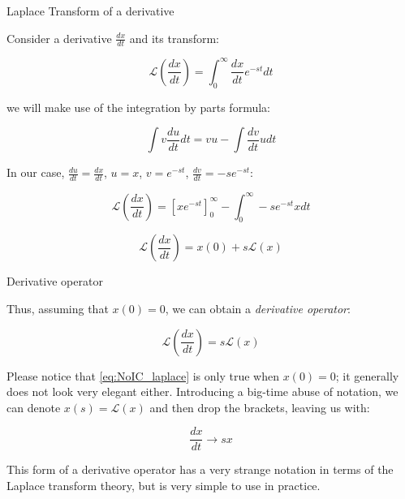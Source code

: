 \documentclass{beamer}
\begin{document}
\begin{frame}{Laplace Transform of a derivative}
\begin{flushleft}

Consider a derivative $\frac{dx}{dt}$ and its transform:

\begin{equation}
    \mathcal{L}\left(\frac{dx}{dt}\right) = \int_0^\infty \frac{dx}{dt} e^{-st}dt
\end{equation}

we will make use of the integration by parts formula:

\begin{definition}
\begin{equation}
\int v \frac{du}{dt} dt = vu - 
\int \frac{dv}{dt} u dt    
\end{equation}
\end{definition}

In our case, $\frac{du}{dt} = \frac{dx}{dt}$, $u = x$, $v = e^{-st}$, $\frac{dv}{dt} = -se^{-st}$:

\begin{equation}
\mathcal{L}\left(\frac{dx}{dt}\right) = \left[x e^{-st} \right]_0^\infty - 
\int_0^\infty -se^{-st} x dt  
\end{equation}

\begin{equation}
\mathcal{L}\left(\frac{dx}{dt}\right) = x(0) + s\mathcal{L}(x)  
\end{equation}

\end{flushleft}
\end{frame}




\begin{frame}{Derivative operator}
\begin{flushleft}

Thus, assuming that $x(0) = 0$, we can obtain a \emph{derivative operator}:

\begin{equation}
\label{eq:NoIC_laplace}
\mathcal{L}\left(\frac{dx}{dt}\right) = s \mathcal{L}\left(x\right)
\end{equation}

\bigskip

Please notice that \eqref{eq:NoIC_laplace} is only true when $x(0) = 0$; it generally does not look very elegant either. Introducing a big-time abuse of notation, we can denote $x(s) = \mathcal{L}\left(x\right)$ and then drop the brackets, leaving us with:

\begin{equation}
\frac{dx}{dt} \longrightarrow s x
\end{equation}

This form of a derivative operator has a very strange notation in terms of the Laplace transform theory, but is very simple to use in practice.

\end{flushleft}
\end{frame}
\end{document}
